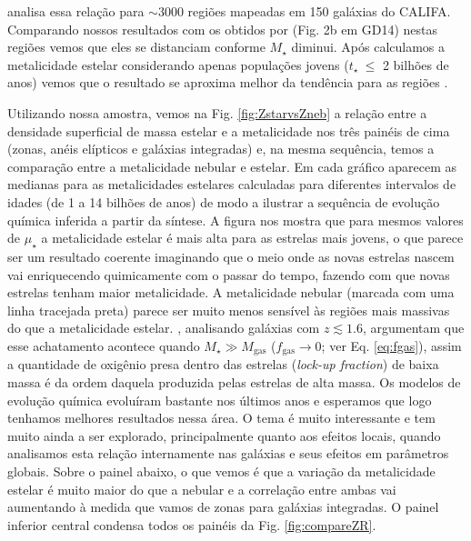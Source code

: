 \citet{Sanchez.etal.2013a} analisa essa relação para $\sim 3000$ regiões \Hii mapeadas em 150
galáxias do CALIFA. Comparando nossos resultados com os obtidos por \citeauthor{Sanchez.etal.2013a}
(Fig. 2b em GD14) nestas regiões vemos que eles se distanciam conforme $M_\star$ diminui.
Após calculamos a metalicidade estelar considerando apenas populações jovens ($t_\star\ \leq$ 2
bilhões de anos) vemos que o resultado se aproxima melhor da tendência para as regiões \Hii.

Utilizando nossa amostra, vemos na Fig. \ref{fig:ZstarvsZneb} a relação entre a densidade
superficial de massa estelar e a metalicidade nos três painéis de cima (zonas, anéis elípticos e
galáxias integradas) e, na mesma sequência, temos a comparação entre a metalicidade nebular e
estelar. Em cada gráfico aparecem as medianas para as metalicidades estelares calculadas para
diferentes intervalos de idades (de 1 a 14 bilhões de anos) de modo a ilustrar a sequência de
evolução química inferida a partir da síntese. A figura nos mostra que para mesmos valores de
$\mu_\star$ a metalicidade estelar é mais alta para as estrelas mais jovens, o que parece ser um
resultado coerente imaginando que o meio onde as novas estrelas nascem vai enriquecendo quimicamente
com o passar do tempo, fazendo com que novas estrelas tenham maior metalicidade. A metalicidade
nebular (marcada com uma linha tracejada preta) parece ser muito menos sensível às regiões mais
massivas do que a metalicidade estelar. \citet{Zahid.etal.2014a}, analisando galáxias com $z
\lesssim 1.6$, argumentam que esse achatamento acontece quando $M_\star \gg M_{\mathrm{gas}}$
($f_{\mathrm{gas}} \to 0$; ver Eq. \ref{eq:fgas}), assim a quantidade de oxigênio presa dentro das
estrelas ({\em lock-up fraction}) de baixa massa é da ordem daquela produzida pelas estrelas de alta
massa. Os modelos de evolução química evoluíram bastante nos últimos anos \citep[e.g.,
][]{Lilly.etal.2013a, Peng.Maiolino.2014a, Ascasibar.etal.2015a, Peng.Maiolino.Cochrane.2015a} e
esperamos que logo tenhamos melhores resultados nessa área. O tema é muito interessante e tem muito
ainda a ser explorado, principalmente quanto aos efeitos locais, quando analisamos esta relação
internamente nas galáxias e seus efeitos em parâmetros globais. Sobre o painel abaixo, o que vemos é
que a variação da metalicidade estelar é muito maior do que a nebular e a correlação entre ambas vai
aumentando à medida que vamos de zonas para galáxias integradas. O painel inferior central condensa
todos os painéis da Fig. \ref{fig:compareZR}.

